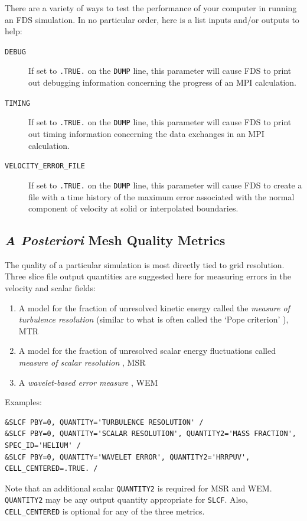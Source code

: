 \documentclass[11pt]{book}
\newcommand{\ct}{\tt\small}
\begin{document}
There are a variety of ways to test the performance of your computer in running an FDS simulation. In no particular order, here is a list inputs and/or outputs to help:
\begin{description}
\item[{\ct DEBUG}]  If set to {\ct .TRUE.} on the {\ct DUMP} line, this parameter will cause FDS to print out debugging information concerning the progress of an MPI
calculation.
\item[{\ct TIMING}] If set to {\ct .TRUE.} on the {\ct DUMP} line, this parameter will cause FDS to print out timing information concerning the data exchanges in an MPI
calculation.
\item[{\ct VELOCITY\_ERROR\_FILE}] If set to {\ct .TRUE.} on the {\ct DUMP} line, this parameter will cause FDS to create a file with a time history of the maximum error
associated with the normal component of velocity at solid or interpolated boundaries.
\end{description}


\subsection{\emph{A Posteriori} Mesh Quality Metrics}
\label{info:meshquality}
The quality of a particular simulation is most directly tied to grid resolution.  Three slice file output quantities are suggested here for measuring errors in the velocity and scalar fields:
\begin{enumerate}
\item A model for the fraction of unresolved kinetic energy called the \emph{measure of turbulence resolution} (similar to what is often called the `Pope criterion' \cite{Pope:2004}), MTR
\item A model for the fraction of unresolved scalar energy fluctuations called \emph{measure of scalar resolution} \cite{Vervisch:2010}, MSR
\item A \emph{wavelet-based error measure} \cite{McDermott:2010}, WEM
\end{enumerate}
Examples:

\footnotesize
\begin{verbatim}
&SLCF PBY=0, QUANTITY='TURBULENCE RESOLUTION' /
&SLCF PBY=0, QUANTITY='SCALAR RESOLUTION', QUANTITY2='MASS FRACTION', SPEC_ID='HELIUM' /
&SLCF PBY=0, QUANTITY='WAVELET ERROR', QUANTITY2='HRRPUV', CELL_CENTERED=.TRUE. /
\end{verbatim} \normalsize
Note that an additional scalar {\ct QUANTITY2} is required for MSR and WEM.  {\ct QUANTITY2} may be any output quantity appropriate for {\ct SLCF}.
Also, {\ct CELL\_CENTERED} is optional for any of the three metrics.
\end{document}
